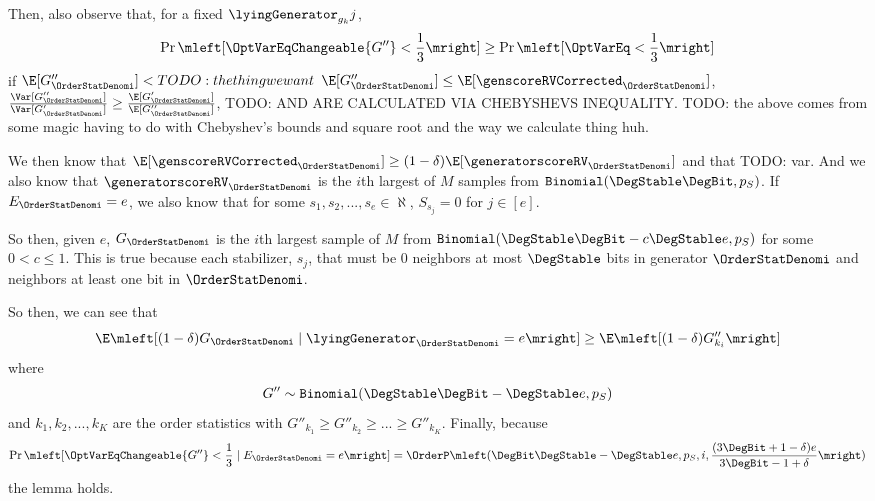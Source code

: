 \newpage

Then, also observe that, for a fixed $\lyingGenerator_{g_k}j$, 
$$
	\Pr\mleft[\OptVarEqChangeable{G''} < \frac{1}{3}\mright] \geq \Pr\mleft[\OptVarEq < \frac{1}{3}\mright]
$$
if $\E[G''_{\OrderStatDenomi}] < TODO: the thing we want$ $\E[G''_{\OrderStatDenomi}] \leq \E[\genscoreRVCorrected_{\OrderStatDenomi}]$, 
$\frac{\Var[G''_{\OrderStatDenomi}]}{\Var[G'_{\OrderStatDenomi}]} \geq \frac{\E[G'_{\OrderStatDenomi}]}{\E[G''_{\OrderStatDenomi}]}$,
TODO: AND ARE CALCULATED VIA CHEBYSHEVS INEQUALITY.
TODO: the above comes from some magic having to do with Chebyshev's bounds and square root
and the way we calculate thing huh. 

We then know that $\E[\genscoreRVCorrected_{\OrderStatDenomi}] \geq (1 - \delta)\E[\generatorscoreRV_{\OrderStatDenomi}]$
and that TODO: var.
And we also know that $\generatorscoreRV_{\OrderStatDenomi}$ is the $i$th largest of $M$ samples from
$\texttt{Binomial}(\DegStable \DegBit, p_S)$. 
If $E_{\OrderStatDenomi} = e$, we also know that for some $s_1, s_2, ..., s_e \in \aleph$, $S_{s_j} = 0$ for $j \in [e]$.

So then, given $e$, $G_{\OrderStatDenomi}$ is the $i$th largest sample of $M$ from $\texttt{Binomial}(\DegStable \DegBit - c\DegStable e, p_S)$
for some $0 < c \leq 1$.
This is true because each stabilizer, $s_j$, that must be 0 neighbors at most $\DegStable$ bits
in generator $\OrderStatDenomi$ and neighbors at least one bit in $\OrderStatDenomi$.

So then, we can see that
$$
	\E\mleft[(1 - \delta) G_{\OrderStatDenomi} \mid \lyingGenerator_{\OrderStatDenomi} = e\mright] \geq \E\mleft[(1 - \delta) G''_{k_i}\mright]
$$
where 
$$
	G'' \sim \texttt{Binomial}(\DegStable \DegBit - \DegStable e, p_S)
$$
and $k_1, k_2, ..., k_K$ are the order statistics with $G''_{k_1} \geq G''_{k_2} \geq ... \geq G''_{k_K}$.
Finally, because 
$$
\Pr\mleft[\OptVarEqChangeable{G''} < \frac{1}{3} \mid E_{\OrderStatDenomi} = e\mright] = 
	\OrderP\mleft(\orderpinner\mright)
$$
the lemma holds.

